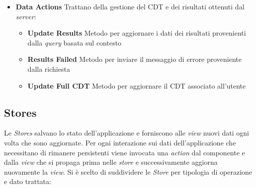 \begin{itemize}
	\item \textbf{Data Actions}
	Trattano della gestione del CDT e dei risultati ottenuti dal \emph{server}:
	\begin{itemize}
		\item \textbf{Update Results}
		Metodo per aggiornare i dati dei risultati provenienti dalla \emph{query} basata sul contesto
		\item \textbf{Results Failed}
		Metodo per inviare il messaggio di errore proveniente dalla richiesta
		\item \textbf{Update Full CDT}
		Metodo per aggiornare il CDT associato all'utente
	\end{itemize}
\end{itemize}

\subsection{Stores\label{sec:stores}}

Le \emph{Stores} salvano lo stato dell'applicazione e forniscono alle \emph{view} nuovi dati ogni volta che sono aggiornate. 
Per ogni interazione sui dati dell'ap\-pli\-ca\-zio\-ne che necessitano di rimanere persistenti viene invocata una \emph{action} dal componente e dalla \emph{view} che si propaga prima nelle \emph{store} e successivamente aggiorna nuovamente la \emph{view}.
Si è scelto di suddividere le \emph{Store} per tipologia di operazione e dato trattata:

